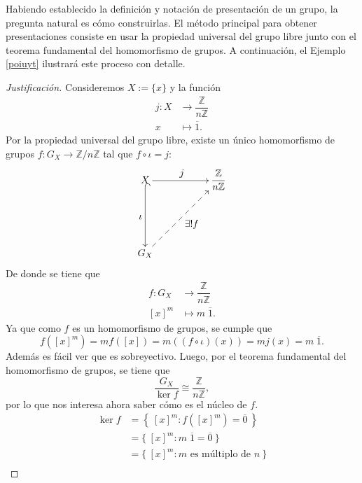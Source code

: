 Habiendo establecido la definición y notación de presentación de un grupo, la pregunta natural es cómo construirlas. El método principal para obtener presentaciones consiste en usar la propiedad universal del grupo libre junto con el teorema fundamental del homomorfismo de grupos. A continuación, el Ejemplo \ref{poiuyt} ilustrará este proceso con detalle.

\begin{ejemplo}\label{poiuyt}
\end{ejemplo}


\begin{proof}[Justificación]
	Consideremos \( X := \{x\} \) y la función 
	\begin{align*}
		j : X &\longrightarrow \dfrac{\mathbb{Z}}{n\mathbb{Z}}\\[4pt]
		x &\longmapsto \overline{1}.
	\end{align*}
	Por la propiedad universal del grupo libre, existe un único homomorfismo de grupos \( f : G_X \to \mathbb{Z}/n\mathbb{Z} \) tal que \( f \circ \iota = j \):
	\[
	\xymatrix{
		X \ar[rr]^{\displaystyle j} \ar@{^(->}[dd]_{\displaystyle \iota } & & \dfrac{\mathbb{Z}}{n\mathbb{Z}} \\
		&&\\
		G_X \ar@{-->}[rruu]_{\displaystyle \exists !f} &&
	}
	\]  
	De donde se tiene que 
	\begin{align*}
		f : G_X &\longrightarrow \dfrac{\mathbb{Z}}{n\mathbb{Z}} \\[4pt]
		[x]^m &\longmapsto m\;\overline{1}.
	\end{align*}
	Ya que como \( f \) es un homomorfismo de grupos, se cumple que 
	\[
	f\left([x]^m\right) = mf\left([x]\right)= m\left((f\circ \iota)(x)\right) = mj(x) = m\;\overline{1}.
	\] Además es fácil ver que es sobreyectivo. Luego, por el teorema fundamental del homomorfismo de grupos, se tiene que 
	\[
	\dfrac{G_{X}}{\ker f} \cong \dfrac{\mathbb{Z}}{n\mathbb{Z}},
	\]
	por lo que nos interesa ahora saber cómo es el núcleo de \( f \). 
	\begin{align*}
		\ker f &= \left\{\:[x]^m : f([x]^m) = \overline{0}\:\right\}\\[4pt]
		&= \{\:[x]^m : m\;\overline{1} = \overline{0}\:\}\\[4pt]
		&= \{\:[x]^m : m \text{ es múltiplo de } n\:\}\\[4pt]

\end{align*}
\end{proof}
